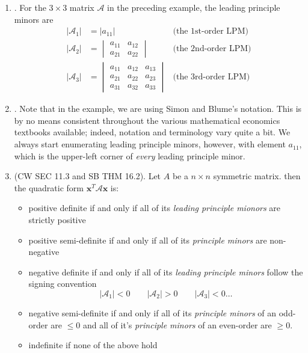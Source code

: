 \documentclass[12pt]{article}
\begin{document}
\begin{enumerate}
\begin{enumerate}
	\item\underline{}.
	For the $3\times 3$ matrix $\mathcal{A}$ in the preceding example, the leading principle minors are
	\begin{align*}
	|\mathcal{A}_1| & = |a_{11}|
	&\text{(the 1st-order LPM)}\\[5pt] 
	|\mathcal{A}_2|&=\begin{vmatrix} a_{11} & a_{12} \\ a_{21} & a_{22} \end{vmatrix}
	&\text{(the 2nd-order LPM)} \\[5pt]
	|\mathcal{A}_3|&=\begin{vmatrix} a_{11} & a_{12} & a_{13} \\ a_{21} & a_{22} & a_{23} \\
	a_{31} & a_{32} & a_{33}\end{vmatrix}
	&\text{(the 3rd-order LPM)}
	\end{align*}
	
	\item\underline{}. Note that in the example, we are using Simon and Blume's notation. This is by no means
	consistent throughout the various mathematical economics textbooks available; indeed, notation and terminology
	vary quite a bit. We always start enumerating leading principle minors, however, with element $a_{11}$, which is
	the upper-left corner of \emph{every} leading principle minor.
	
	\item\underline{} (CW SEC 11.3 and SB THM 16.2).
	Let $A$ be a $n\times n$ symmetric matrix. then the quadratic form $\mathbf{x}^T \mathcal{A}\mathbf{x}$ is:
	\begin{itemize}
		\item positive definite if and only if all of its \emph{leading principle mionors} are strictly positive
		\item positive semi-definite if and only if all of its \emph{principle minors} are non-negative
		\item negative definite if and only if all of its \emph{leading principle minors} follow the signing convention
		\[|\mathcal{A}_{1}|<0 \quad\quad |\mathcal{A}_{2}|>0 \quad\quad |\mathcal{A}_{3}|<0 \dots\]
		\item negative semi-definite if and only if all of its \emph{principle minors} of an odd-order are $\leq 0$
		and all of it's \emph{principle minors} of an even-order are $\geq 0$.
		\item indefinite if none of the above hold
	\end{itemize}


\end{enumerate}
\end{enumerate}
\end{document}
